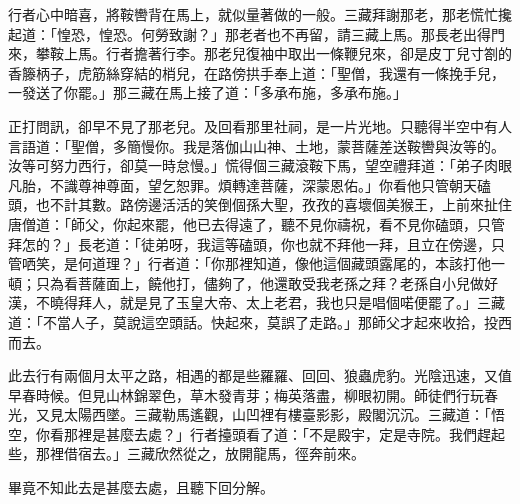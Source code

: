 行者心中暗喜，將鞍轡背在馬上，就似量著做的一般。三藏拜謝那老，那老慌忙攙起道：「惶恐，惶恐。何勞致謝？」那老者也不再留，請三藏上馬。那長老出得門來，攀鞍上馬。行者擔著行李。那老兒復袖中取出一條鞭兒來，卻是皮丁兒寸劄的香籐柄子，虎筋絲穿結的梢兒，在路傍拱手奉上道：「聖僧，我還有一條挽手兒，一發送了你罷。」那三藏在馬上接了道：「多承布施，多承布施。」

正打問訊，卻早不見了那老兒。及回看那里社祠，是一片光地。只聽得半空中有人言語道：「聖僧，多簡慢你。我是落伽山山神、土地，蒙菩薩差送鞍轡與汝等的。汝等可努力西行，卻莫一時怠慢。」慌得個三藏滾鞍下馬，望空禮拜道：「弟子肉眼凡胎，不識尊神尊面，望乞恕罪。煩轉達菩薩，深蒙恩佑。」你看他只管朝天磕頭，也不計其數。路傍邊活活的笑倒個孫大聖，孜孜的喜壞個美猴王，上前來扯住唐僧道：「師父，你起來罷，他已去得遠了，聽不見你禱祝，看不見你磕頭，只管拜怎的？」長老道：「徒弟呀，我這等磕頭，你也就不拜他一拜，且立在傍邊，只管哂笑，是何道理？」行者道：「你那裡知道，像他這個藏頭露尾的，本該打他一頓；只為看菩薩面上，饒他打，儘夠了，他還敢受我老孫之拜？老孫自小兒做好漢，不曉得拜人，就是見了玉皇大帝、太上老君，我也只是唱個喏便罷了。」三藏道：「不當人子，莫說這空頭話。快起來，莫誤了走路。」那師父才起來收拾，投西而去。

此去行有兩個月太平之路，相遇的都是些羅羅、回回、狼蟲虎豹。光陰迅速，又值早春時候。但見山林錦翠色，草木發青芽；梅英落盡，柳眼初開。師徒們行玩春光，又見太陽西墜。三藏勒馬遙觀，山凹裡有樓臺影影，殿閣沉沉。三藏道：「悟空，你看那裡是甚麼去處？」行者擡頭看了道：「不是殿宇，定是寺院。我們趕起些，那裡借宿去。」三藏欣然從之，放開龍馬，徑奔前來。

畢竟不知此去是甚麼去處，且聽下回分解。
